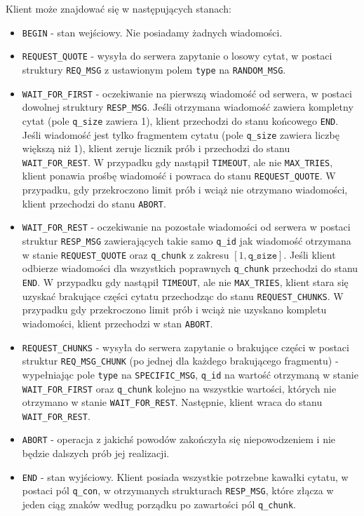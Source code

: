 \documentclass[a4paper,11pt,titlepage]{article}
\begin{document}
Klient może znajdować się w następujących stanach:
\begin{itemize}
\item \texttt{BEGIN} - stan wejściowy. Nie posiadamy żadnych wiadomości.

\item \texttt{REQUEST\_QUOTE} - wysyła do serwera zapytanie o losowy cytat,
w postaci struktury \texttt{REQ\_MSG} z ustawionym polem \texttt{type} na
\texttt{RANDOM\_MSG}.

\item \texttt{WAIT\_FOR\_FIRST} - oczekiwanie na pierwszą wiadomość od serwera,
w postaci dowolnej struktury \texttt{RESP\_MSG}. Jeśli otrzymana wiadomość
zawiera kompletny cytat (pole \texttt{q\_size} zawiera 1), klient przechodzi 
do stanu końcowego \texttt{END}. Jeśli wiadomość jest tylko fragmentem cytatu
(pole \texttt{q\_size} zawiera liczbę większą niż 1), klient zeruje licznik prób
i przechodzi do stanu \texttt{WAIT\_FOR\_REST}. W przypadku gdy nastąpił
\texttt{TIMEOUT}, ale nie \texttt{MAX\_TRIES}, klient ponawia prośbę wiadomość
i powraca do stanu \texttt{REQUEST\_QUOTE}. W przypadku, gdy przekroczono limit
prób i wciąż nie otrzymano wiadomości, klient przechodzi do stanu
\texttt{ABORT}.

\item \texttt{WAIT\_FOR\_REST} - oczekiwanie na pozostałe wiadomości od
serwera w postaci struktur \texttt{RESP\_MSG} zawierających takie samo
\texttt{q\_id} jak wiadomość otrzymana w stanie \texttt{REQUEST\_QUOTE}
oraz \texttt{q\_chunk} z zakresu $[1, \texttt{q\_size}]$. Jeśli klient
odbierze wiadomości dla wszystkich poprawnych \texttt{q\_chunk} przechodzi
do stanu \texttt{END}. W przypadku gdy nastąpił \texttt{TIMEOUT}, ale nie
\texttt{MAX\_TRIES}, klient stara się uzyskać brakujące części cytatu
przechodząc do stanu \texttt{REQUEST\_CHUNKS}. W przypadku gdy przekroczono
limit prób i wciąż nie uzyskano kompletu wiadomości, klient przechodzi w stan
\texttt{ABORT}.

\item \texttt{REQUEST\_CHUNKS} - wysyła do serwera zapytanie o brakujące
części w postaci struktur \texttt{REQ\_MSG\_CHUNK} (po jednej dla każdego
brakującego fragmentu) - wypełniając pole \texttt{type} na
\texttt{SPECIFIC\_MSG}, \texttt{q\_id} na wartość otrzymaną w stanie
\texttt{WAIT\_FOR\_FIRST} oraz \texttt{q\_chunk} kolejno na wszystkie
wartości, których nie otrzymano w stanie \texttt{WAIT\_FOR\_REST}. Następnie,
klient wraca do stanu \texttt{WAIT\_FOR\_REST}.

\item \texttt{ABORT} - operacja z jakichś powodów zakończyła się niepowodzeniem
i nie będzie dalszych prób jej realizacji.

\item \texttt{END} - stan wyjściowy. Klient posiada wszystkie potrzebne kawałki
cytatu, w postaci pól \texttt{q\_con}, w otrzymanych strukturach
\texttt{RESP\_MSG}, które złącza w jeden ciąg znaków według porządku po
zawartości pól \texttt{q\_chunk}.

\end{itemize}
\end{document}
